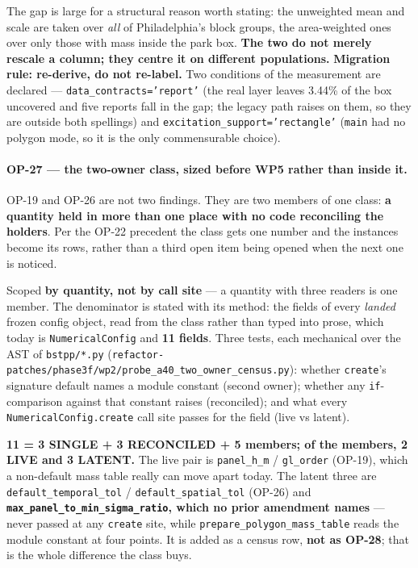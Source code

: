 \documentclass[
  10pt,
]{article}
\begin{document}
The gap is large for a structural reason worth stating: the unweighted mean and scale are taken over \emph{all} of Philadelphia's block groups, the area-weighted ones over only those with mass inside the park box. \textbf{The two do not merely rescale a column; they centre it on different populations.} \textbf{Migration rule: re-derive, do not re-label.} Two conditions of the measurement are declared --- \texttt{data\_contracts='report'} (the real layer leaves 3.44\% of the box uncovered and five reports fall in the gap; the legacy path raises on them, so they are outside both spellings) and \texttt{excitation\_support='rectangle'} (\texttt{main} had no polygon mode, so it is the only commensurable choice).

\paragraph{OP-27 --- the two-owner class, sized before WP5 rather than inside it.}
OP-19 and OP-26 are not two findings. They are two members of one class: \textbf{a quantity held in more than one place with no code reconciling the holders}. Per the OP-22 precedent the class gets one number and the instances become its rows, rather than a third open item being opened when the next one is noticed.

Scoped \textbf{by quantity, not by call site} --- a quantity with three readers is one member. The denominator is stated with its method: the fields of every \emph{landed} frozen config object, read from the class rather than typed into prose, which today is \texttt{NumericalConfig} and \textbf{11 fields}. Three tests, each mechanical over the AST of \texttt{bstpp/*.py} (\texttt{refactor-patches/\allowbreak{}phase3f/wp2/\allowbreak{}probe\_a40\_two\_owner\_census.py}): whether \texttt{create}'s signature default names a module constant (second owner); whether any \texttt{if}-comparison against that constant raises (reconciled); and what every \texttt{NumericalConfig.create} call site passes for the field (live vs latent).

\textbf{11 = 3 SINGLE + 3 RECONCILED + 5 members; of the members, 2 LIVE and 3 LATENT.} The live pair is \texttt{panel\_h\_m} / \texttt{gl\_order} (OP-19), which a non-default mass table really can move apart today. The latent three are \texttt{default\_temporal\_tol} / \texttt{default\_spatial\_tol} (OP-26) and \textbf{\texttt{max\_panel\_to\_min\_sigma\_ratio}, which no prior amendment names} --- never passed at any \texttt{create} site, while \texttt{prepare\_polygon\_mass\_table} reads the module constant at four points. It is added as a census row, \textbf{not as OP-28}; that is the whole difference the class buys.
\end{document}
